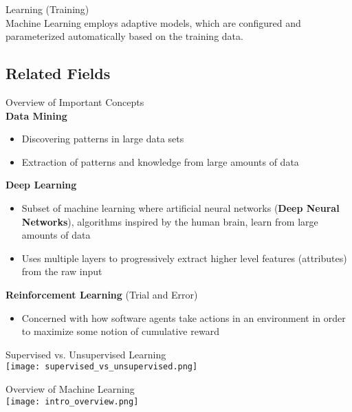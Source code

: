 \begin{definition}{Learning (Training)}\\
Machine Learning employs adaptive models, which are configured and parameterized automatically based on the training data.
\end{definition}

\subsection{Related Fields}

\begin{theorem}{Overview of Important Concepts}\\
    \textcolor{frog}{\textbf{Data Mining}}
    \begin{itemize}
        \item Discovering patterns in large data sets
        \item Extraction of patterns and knowledge from large amounts of data
    \end{itemize}
    \textcolor{frog}{\textbf{Deep Learning}}
    \begin{itemize}
        \item Subset of machine learning where artificial neural networks (\textcolor{frog}{\textbf{Deep Neural Networks}}), algorithms inspired by the human brain, learn from large amounts of data
        \item Uses multiple layers to progressively extract higher level features (attributes) from the raw input
    \end{itemize}
    \textcolor{frog}{\textbf{Reinforcement Learning}} (Trial and Error)
    \begin{itemize}
        \item Concerned with how software agents take actions in an environment in order to maximize some notion of cumulative reward
    \end{itemize}
\end{theorem}

\begin{concept}{Supervised vs. Unsupervised Learning}\\
    \texttt{[image: supervised\_vs\_unsupervised.png]}
\end{concept}

\raggedcolumns

\multend

\begin{concept}{Overview of Machine Learning}\\
    \texttt{[image: intro\_overview.png]}
\end{concept}


